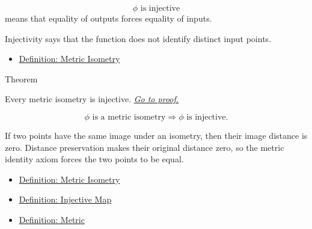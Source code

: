 \begin{remark*}
\[
\phi\text{ is injective}
\]
means that equality of outputs forces equality of inputs.
\end{remark*}

\begin{remark*}[Interpretation]
Injectivity says that the function does not identify distinct input points.
\end{remark*}


\begin{dependencies}
\begin{itemize}
  \item \hyperref[def:metric-isometry]{Definition: Metric Isometry}
\end{itemize}
\end{dependencies}

\begin{theorembox}{Theorem}
\begin{theorem}\label{thm:metric-isometries-injective}
Every metric isometry is injective.
\hyperref[prf:metric-isometries-injective]{\textit{Go to proof.}}
\end{theorem}
\end{theorembox}

\begin{remark*}
\[
\phi\text{ is a metric isometry}
\Longrightarrow
\phi\text{ is injective}.
\]
\end{remark*}

\begin{remark*}[Interpretation]
If two points have the same image under an isometry, then their image distance
is zero.  Distance preservation makes their original distance zero, so the
metric identity axiom forces the two points to be equal.
\end{remark*}


\begin{dependencies}
\begin{itemize}
  \item \hyperref[def:metric-isometry]{Definition: Metric Isometry}
  \item \hyperref[def:injective-map]{Definition: Injective Map}
  \item \hyperref[def:metric-on-set]{Definition: Metric}
\end{itemize}
\end{dependencies}

